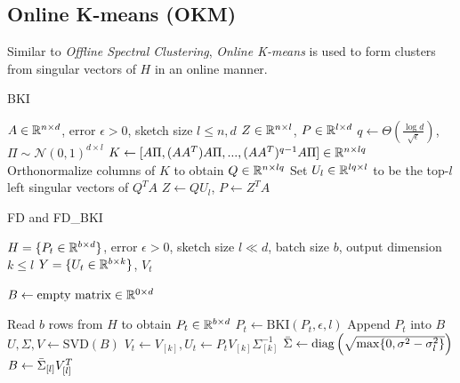 \subsection{Online K-means (OKM)}

Similar to \textit{Offline Spectral Clustering}, \textit{Online K-means} is used to form clusters from singular vectors of $H$ in an online manner.


\begin{algorithm}
\caption{BKI \cite{musco2015randomized}}\label{alg:bki}
\begin{algorithmic}[1]
\Require $A \in \mathbb{R}^{n \times d}$, error $\epsilon > 0$, sketch size $l \leq n, d$
\Ensure $Z \in \mathbb{R}^{n \times l}$, $P \in \mathbb{R}^{l \times d}$
\State $q \gets \Theta(\frac{\log d}{\sqrt{\epsilon}})$, $\Pi \sim \mathcal{N}(0, 1)^{d \times l}$
\State $K \gets [A\Pi, (AA^T) A\Pi, ..., (AA^T)^{q-1} A\Pi] \in \mathbb{R}^{n \times lq}$
\State Orthonormalize columns of $K$ to obtain $Q \in \mathbb{R}^{n \times lq}$
\State Set $U_l \in \mathbb{R}^{lq \times l}$ to be the top-$l$ left singular vectors of $Q^T A$
\State $Z \gets Q U_l$, $P \gets Z^T A$
\end{algorithmic}
\end{algorithm}

\begin{algorithm}
\caption{FD \cite{yoo2016streaming} and FD\_BKI}\label{alg:fd_bki}
\begin{algorithmic}[1]
\Require $H = \{P_t \in \mathbb{R}^{b \times d} \}$, error $\epsilon > 0$, sketch size $l \ll d$, batch size $b$, output dimension $k \leq l$
\Ensure $Y = \{U_t \in \mathbb{R}^{b \times k} \}$, $V_t$

\State $B \gets \text{empty matrix} \in \mathbb{R}^{0 \times d}$

    \State Read $b$ rows from $H$ to obtain $P_t \in \mathbb{R}^{b \times d}$
        \State $P_t \gets \text{BKI}(P_t, \epsilon, l)$ 
    \EndIf
    \State Append $P_t$ into $B$
    \State $U, \Sigma, V \gets \text{SVD}(B)$
    \State $V_t \gets V_{[k]}, U_t \gets P_t V_{[k]} \Sigma_{[k]}^{-1}$
        \State $\Bar{\Sigma} \gets \operatorname{diag} \left( \sqrt{\max \{0, \sigma^2 - \sigma_l^2\}}\right)$
        \State $B \gets \Bar{\Sigma}_{[l]} V_{[l]}^T$
    \EndIf
\EndWhile

\end{algorithmic}
\end{algorithm}